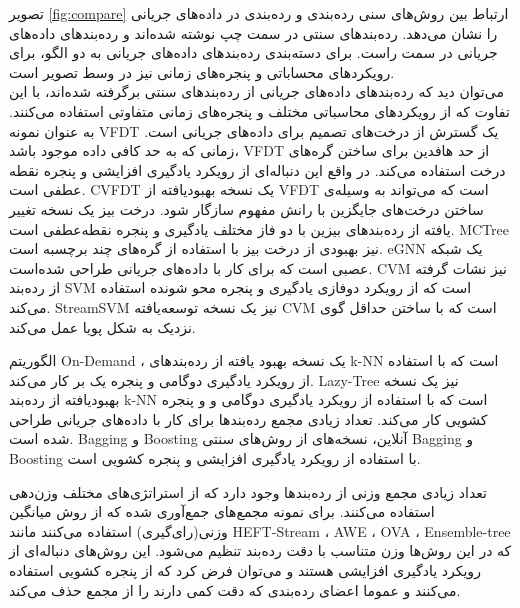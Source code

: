 تصویر
\ref{fig:compare} \cite{Nguyen2015}
ارتباط بین روش‌های سنی رده‌بندی و رده‌بندی در داده‌های جریانی را نشان می‌دهد. رده‌بندهای سنتی در سمت چپ نوشته‌ شده‌اند و رده‌بندهای داده‌های جریانی در سمت راست. برای دسته‌بندی رده‌بندهای داده‌های جریانی به دو الگو، برای رویکردهای محساباتی و پنجره‌های زمانی نیز در وسط تصویر است.
\\
می‌توان دید که رده‌بندهای داده‌های جریانی از رده‌بندهای سنتی برگرفته شده‌اند، با این تفاوت که از رویکردهای محاسباتی مختلف و پنجره‌های زمانی متفاوتی استفاده می‌کنند. به عنوان نمونه VFDT یک گسترش از درخت‌های تصمیم برای داده‌های جریانی است. زمانی که به حد کافی داده موجود باشد، VFDT از حد هافدین برای ساختن گره‌های درخت استفاده می‌کند. در واقع این دنباله‌ای از رویکرد یادگیری افزایشی و پنجره نقطه عطفی است. CVFDT یک نسخه بهبودیافته از VFDT است که می‌تواند به وسیله‌ی ساختن درخت‌های جایگزین با رانش مفهوم سازگار شود. درخت بیز یک نسخه تغییر یافته از رده‌بندهای بیزین با دو فاز مختلف یادگیری و پنجره نقطه‌عطفی است. MCTree نیز بهبودی از درخت بیز با استفاده از گره‌های چند برچسبه است. eGNN یک شبکه عصبی است که برای کار با داده‌های جریانی طراحی شده‌است. CVM نیز نشات گرفته از رده‌بند SVM است که از رویکرد دوفازی یادگیری و پنجره محو شونده استفاده می‌کند. StreamSVM نیز یک نسخه توسعه‌یافته CVM است که با ساختن حداقل گوی نزدیک به شکل پویا عمل می‌کند.

 
الگوریتم‌ On-Demand ، یک نسخه بهبود یافته از رده‌بندهای k-NN است که با استفاده از رویکرد یادگیری دوگامی و پنجره یک بر کار می‌کند. Lazy-Tree نیز یک نسخه بهبود‌یافته از رده‌بند k-NN است که با استفاده از رویکرد یادگیری دوگامی و و پنجره کشویی کار می‌کند.
تعداد زیادی مجمع رده‌بندها برای کار با داده‌های جریانی طراحی شده است. Bagging و Boosting آنلاین، نسخه‌های از روش‌های سنتی Bagging و Boosting با استفاده از رویکرد یادگیری افزایشی و پنجره کشویی است.


تعداد زیادی مجمع وزنی از رده‌بندها وجود دارد که از استراتژی‌های مختلف وزن‌دهی استفاده می‌کنند. برای نمونه مجمع‌های جمع‌آوری شده که از روش‌ میانگین وزنی(رای‌گیری) استفاده می‌کنند مانند HEFT-Stream ، AWE ، OVA ، Ensemble-tree که در این روش‌ها وزن متناسب با دقت رده‌بند تنظیم می‌شود. این روش‌های دنباله‌ای از رویکرد یادگیری افزایشی هستند و می‌توان فرض کرد که از پنجره کشویی استفاده می‌کنند و عموما اعضای رده‌بندی که دقت کمی دارند را از مجمع حذف می‌کند.

